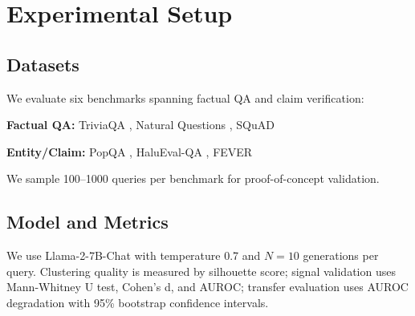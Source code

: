 \section{Experimental Setup}

\subsection{Datasets}

We evaluate six benchmarks spanning factual QA and claim verification:

\textbf{Factual QA:} TriviaQA \cite{joshi2017triviaqa}, Natural Questions \cite{kwiatkowski2019natural}, SQuAD \cite{rajpurkar2016squad}

\textbf{Entity/Claim:} PopQA \cite{mallen2023trust}, HaluEval-QA \cite{li2023halueval}, FEVER \cite{thorne2018fever}

We sample 100--1000 queries per benchmark for proof-of-concept validation.

\subsection{Model and Metrics}

We use Llama-2-7B-Chat with temperature 0.7 and $N=10$ generations per query. Clustering quality is measured by silhouette score; signal validation uses Mann-Whitney U test, Cohen's d, and AUROC; transfer evaluation uses AUROC degradation with 95\% bootstrap confidence intervals.
